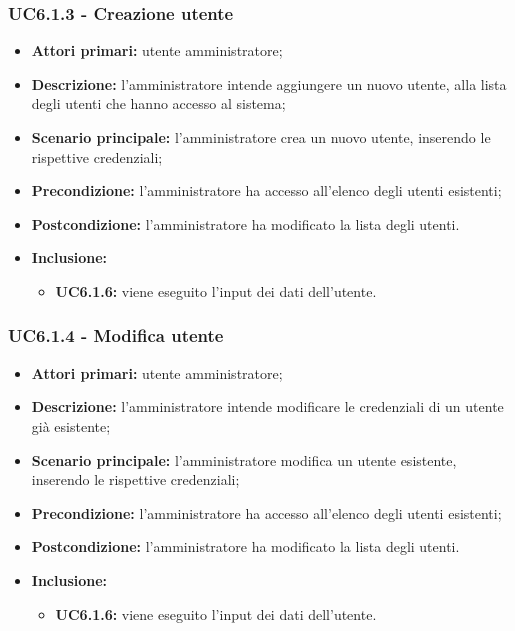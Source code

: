 \subsubsection{UC6.1.3 - Creazione utente}
	\begin{itemize}
		\item \textbf{Attori primari:} utente amministratore;
		\item \textbf{Descrizione:} l'amministratore intende aggiungere un nuovo utente, alla lista degli utenti che hanno accesso al sistema;
		\item \textbf{Scenario principale:} l'amministratore crea un nuovo utente, inserendo le rispettive credenziali;
		\item \textbf{Precondizione:} l'amministratore ha accesso all'elenco degli utenti esistenti;
		\item \textbf{Postcondizione:} l'amministratore ha modificato la lista degli utenti.
		\item \textbf{Inclusione:} 
		\begin{itemize}
			\item \textbf{UC6.1.6:} viene eseguito l'input dei dati dell'utente.
		\end{itemize}
	\end{itemize}

\subsubsection{UC6.1.4 - Modifica utente}
	\begin{itemize}
		\item \textbf{Attori primari:} utente amministratore;
		\item \textbf{Descrizione:} l'amministratore intende modificare le credenziali di un utente già esistente;
		\item \textbf{Scenario principale:} l'amministratore modifica un utente esistente, inserendo le rispettive credenziali;
		\item \textbf{Precondizione:} l'amministratore ha accesso all'elenco degli utenti esistenti;
		\item \textbf{Postcondizione:} l'amministratore ha modificato la lista degli utenti.
		\item \textbf{Inclusione:} 
		\begin{itemize}
			\item \textbf{UC6.1.6:} viene eseguito l'input dei dati dell'utente.
		\end{itemize}
	\end{itemize}

